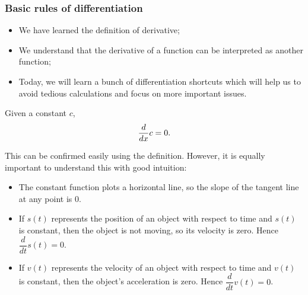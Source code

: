 \documentclass[10pt,t,presentation,ignorenonframetext,aspectratio=169]{beamer}
\title[\course]{\lecTitle}
\institute[Ohio State]
{
  \medskip
}
\date[\week]{\semester}
\author{Tae Eun Kim, Ph.D.}
\begin{document}
\begin{frame}
  \titlepage
\end{frame}

\begin{frame}
  \frametitle{Basic rules of differentiation}
  \begin{itemize}
  \item We have learned the definition of derivative;
  \item We understand that the derivative of a function can be
    interpreted as another function;
  \item Today, we will learn a
    bunch of differentiation shortcuts which will help us to avoid tedious calculations and focus on more important issues.
  \end{itemize}

\end{frame}

\begin{frame}
  \vs
  \begin{thm}
    Given a constant $c$,
    \[
      \frac{d}{\mathop{}\!d x} c = 0.
    \]
  \end{thm}

  \vs
  This can be confirmed easily using the definition. However, it is
  equally important to understand this with good intuition:
  \begin{itemize}
  \item The constant function plots a horizontal line, so the slope of
    the tangent line at any point is $0$.
  \item If $s(t)$ represents the position of an object with respect to
    time and $s(t)$ is constant, then the object is not moving, so its
    velocity is zero. Hence $\dfrac{d}{d t} s(t) = 0$.
  \item If $v(t)$ represents the velocity of an object with respect to
    time and $v(t)$ is constant, then the object's acceleration is
    zero. Hence $\dfrac{d}{dt} v(t) = 0$.
  \end{itemize}
\end{frame}
\end{document}
